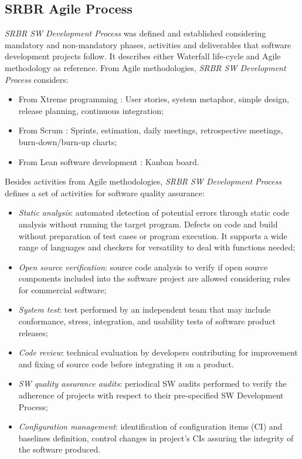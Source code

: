 \subsection{SRBR Agile Process \label{sec:sec2-2}}

\textit{SRBR SW Development Process} was defined and established considering mandatory and non-mandatory phases, activities and deliverables that software development projects follow. It describes either Waterfall life-cycle and Agile methodology as reference. From Agile methodologies, \textit{SRBR SW Development Process} considers:

\begin{itemize}
\item From Xtreme programming \cite{XP13}: User stories, system metaphor, simple design, release planning, continuous integration;
\item From Scrum \cite{Scrum18}: Sprints, estimation, daily meetings, retrospective meetings, burn-down/burn-up charts;
\item From Lean software development \cite{Poppendieck:2003:LSD}: Kanban board.
\end{itemize}

Besides activities from Agile methodologies, \textit{SRBR SW Development Process} defines a set of activities for software quality assurance:

\begin{itemize}
\item \textit{Static analysis}: automated detection of potential errors through static code analysis without running the target program. Defects on code and build without preparation of test cases or program execution. It supports a wide range of languages and checkers for versatility to deal with functions needed;
\item \textit{Open source verification}: source code analysis to verify if open source components included into the software project are allowed considering rules for commercial software;
\item \textit{System test}: test performed by an independent team that may include conformance, stress, integration, and usability tests of software product releases;
\item \textit{Code review}: technical evaluation by developers contributing for improvement and fixing of source code before integrating it on a product. 
\item \textit{SW quality assurance audits}: periodical SW audits performed to verify the adherence of projects with respect to their pre-specified SW Development Process;
\item \textit{Configuration management}: identification of configuration items (CI) and baselines definition, control  changes in project's CIs assuring the integrity of the software produced.

\end{itemize}

